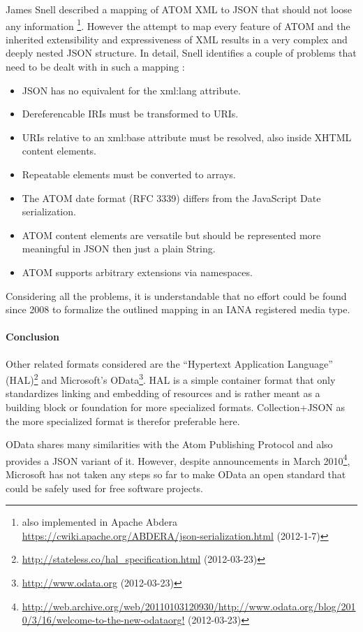 \documentclass[11pt,a4paper,headsepline,twoside]{scrartcl}		%
\newcommand{\citeurl}[2]{\url{#1} (#2)}
\begin{document}
James Snell described a mapping of ATOM XML to JSON that should not loose any
information \cite{Snell2008}\footnote{also implemented in Apache Abdera
  \citeurl{https://cwiki.apache.org/ABDERA/json-serialization.html}{2012-1-7}}. However
the attempt to map every feature of ATOM and the inherited extensibility and
expressiveness of XML results in a very complex and deeply nested JSON
structure. In detail, Snell identifies a couple of problems that need to be
dealt with in such a mapping \cite{Snell2008}:

\begin{itemize}
  \item JSON has no equivalent for the xml:lang attribute.
  \item Dereferencable IRIs must be transformed to URIs.
  \item URIs relative to an xml:base attribute must be resolved, also inside XHTML content elements.
  \item Repeatable elements must be converted to arrays.
  \item The ATOM date format (RFC 3339) differs from the JavaScript Date serialization.
  \item ATOM content elements are versatile but should be represented more meaningful in JSON then just a plain String.
  \item ATOM supports arbitrary extensions via namespaces.
\end{itemize}

Considering all the problems, it is understandable that no effort could be found
since 2008 to formalize the outlined mapping in an IANA registered media type.

\paragraph{Conclusion}

Other related formats considered are the ``Hypertext Application Language''
(HAL)\footnote{\citeurl{http://stateless.co/hal_specification.html}{2012-03-23}}
and Microsoft's OData\footnote{\citeurl{http://www.odata.org}{2012-03-23}}. HAL
is a simple container format that only standardizes linking and embedding of
resources and is rather meant as a building block or foundation for more
specialized formats. Collection+JSON as the more specialized format is therefor
preferable here.

OData shares many similarities with the Atom Publishing Protocol and also
provides a JSON variant of it. However, despite announcements in March
2010\footnote{\citeurl{http://web.archive.org/web/20110103120930/http://www.odata.org/blog/2010/3/16/welcome-to-the-new-odataorg!}{2012-03-23}},
Microsoft has not taken any steps so far to make OData an open standard that
could be safely used for free software projects.
\end{document}
